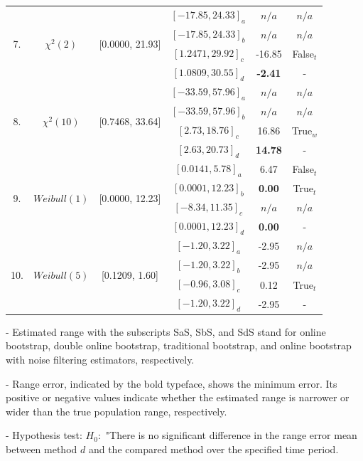 \documentclass[a4paper,fleqn]{cas-dc}
\begin{document}
\begin{table}[h!]
\begin{threeparttable}
\begin{tabular}{|c|c|c|c|c|c|}
\hline
\multirow{4}{*}{7.} & \multirow{4}{*}{$\chi^2(2)$}&\multirow{4}{*}{[0.0000, 21.93]} & $[-17.85, 24.33]_a$& 
    $n/a$ & $n/a$ \\
    &&&$[-17.85, 24.33]_b$ & $n/a$ & $n/a$\\
    &&&$[1.2471, 29.92]_c$ &    -16.85  & False$_t$\\
    &&&$[1.0809, 30.55]_d$ & \bf{-2.41} & - \\                
\hline
\multirow{4}{*}{8.} & \multirow{4}{*}{$\chi^2(10)$}&\multirow{4}{*}{[0.7468, 33.64]} & $[-33.59, 57.96]_a$& 
    $n/a$ & $n/a$\\
    &&&$[-33.59, 57.96]_b$ & $n/a$ & $n/a$\\
    &&&$[2.73, 18.76]_c$ & 16.86      &  True$_w$\\
    &&&$[2.63, 20.73]_d$ & \bf{14.78} & - \\       
    
\hline
\multirow{4}{*}{9.} & \multirow{4}{*}{$Weibull(1)$}&\multirow{4}{*}{[0.0000, 12.23]} & $[0.0141, 5.78]_a$& 
    6.47 & False$_t$\\
    &&&$[0.0001, 12.23]_b$ & \bf{0.00} &  True$_t$\\
    &&&$[-8.34, 11.35]_c$ & $n/a$      &  $n/a$\\
    &&&$[0.0001, 12.23]_d$ & \bf{0.00} & - \\  
\hline
\multirow{4}{*}{10.} & \multirow{4}{*}{$Weibull(5)$}&\multirow{4}{*}{[0.1209, 1.60]} & $[-1.20, 3.22]_a$& 
    -2.95 & $n/a$\\
    &&&$[-1.20, 3.22]_b$ & -2.95 &$n/a$\\
    &&&$[-0.96, 3.08]_c$ & 0.12      & True$_t$\\
    &&&$[-1.20, 3.22]_d$ & -2.95 & -\\    
\bottomrule
\end{tabular}
\begin{tablenotes}
          \scriptsize
          \item - Estimated range with the subscripts SaS, SbS, and SdS stand for online bootstrap, double online bootstrap, traditional bootstrap, and online bootstrap with noise filtering estimators, respectively.
          \item - Range error, indicated by the bold typeface, shows the minimum error. Its positive or negative values indicate whether the estimated range is narrower or wider than the true population range, respectively.
         \item - Hypothesis test: $H_0:$ "There is no significant difference in the range error mean between method $d$ and 
         the compared method over the specified time period.
    \end{tablenotes}
\end{threeparttable}
\end{table}
\end{document}
